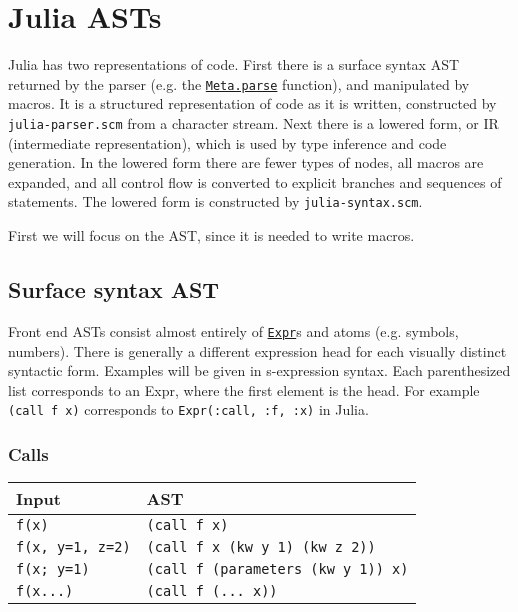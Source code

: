 \hypertarget{16235973380684375384}{}


\section{Julia ASTs}



Julia has two representations of code. First there is a surface syntax AST returned by the parser (e.g. the \hyperlink{10422957797582368651}{\texttt{Meta.parse}} function), and manipulated by macros. It is a structured representation of code as it is written, constructed by \texttt{julia-parser.scm} from a character stream. Next there is a lowered form, or IR (intermediate representation), which is used by type inference and code generation. In the lowered form there are fewer types of nodes, all macros are expanded, and all control flow is converted to explicit branches and sequences of statements. The lowered form is constructed by \texttt{julia-syntax.scm}.



First we will focus on the AST, since it is needed to write macros.



\hypertarget{6198433338459689204}{}


\subsection{Surface syntax AST}



Front end ASTs consist almost entirely of \hyperlink{17120496304147995299}{\texttt{Expr}}s and atoms (e.g. symbols, numbers). There is generally a different expression head for each visually distinct syntactic form. Examples will be given in s-expression syntax. Each parenthesized list corresponds to an Expr, where the first element is the head. For example \texttt{(call f x)} corresponds to \texttt{Expr(:call, :f, :x)} in Julia.



\hypertarget{13191950853363974893}{}


\subsubsection{Calls}




\begin{table}[h]

\begin{tabulary}{\linewidth}{|L|L|}
\hline
Input & AST \\
\hline
\texttt{f(x)} & \texttt{(call f x)} \\
\hline
\texttt{f(x, y=1, z=2)} & \texttt{(call f x (kw y 1) (kw z 2))} \\
\hline
\texttt{f(x; y=1)} & \texttt{(call f (parameters (kw y 1)) x)} \\
\hline
\texttt{f(x...)} & \texttt{(call f (... x))} \\
\hline
\end{tabulary}

\end{table}




